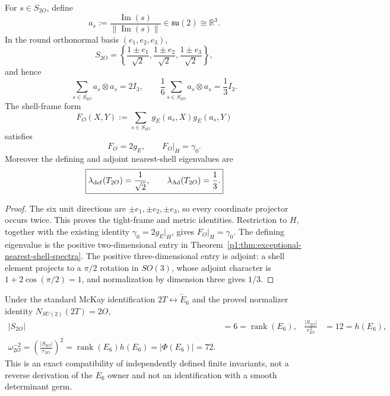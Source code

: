 \documentclass[11pt]{article}
\begin{document}
\begin{theorem}
\label{p1:thm:2O-nearest-shell-tangent-frame}
For \(s\in S_{2O}\), define
\[
 a_s:=\frac{\operatorname{Im}(s)}{\|\operatorname{Im}(s)\|}
 \in\mathfrak{su}(2)\cong\mathbb R^3.
\]
In the round orthonormal basis \((e_1,e_2,e_3)\),
\[
 S_{2O}=\left\{
 \frac{1\pm e_1}{\sqrt2},
 \frac{1\pm e_2}{\sqrt2},
 \frac{1\pm e_3}{\sqrt2}\right\},
\]
and hence
\begin{equation}
\label{p1:eq:2O-shell-tight-frame}
 \boxed{\sum_{s\in S_{2O}}a_s\otimes a_s=2I_3,\qquad
 \frac1{6}\sum_{s\in S_{2O}}a_s\otimes a_s=\frac13I_3.}
\end{equation}
The shell-frame form
\[
 F_O(X,Y):=\sum_{s\in S_{2O}}
 g_E(a_s,X)g_E(a_s,Y)
\]
satisfies
\begin{equation}
\label{p1:eq:2O-shell-frame-metric}
 \boxed{F_O=2g_E,\qquad F_O|_H=\gamma_0.}
\end{equation}
Moreover the defining and adjoint nearest-shell eigenvalues are
\begin{equation}
\label{p1:eq:2O-def-ad-eigenvalues}
 \boxed{\lambda_{\rm def}(T_{2O})=\frac1{\sqrt2},\qquad
 \lambda_{\operatorname{Ad}}(T_{2O})=\frac13.}
\end{equation}
\end{theorem}

\begin{proof}
The six unit directions are \(\pm e_1,\pm e_2,\pm e_3\), so every coordinate
projector occurs twice.  This proves the tight-frame and metric identities.
Restriction to \(H\), together with the existing identity
\(\gamma_0=2g_E|_H\), gives \(F_O|_H=\gamma_0\).  The defining eigenvalue is
the positive two-dimensional entry in
Theorem~\ref{p1:thm:exceptional-nearest-shell-spectra}.  The positive
three-dimensional entry is adjoint: a shell element projects to a
\(\pi/2\) rotation in \(SO(3)\), whose adjoint character is
\(1+2\cos(\pi/2)=1\), and normalization by dimension three gives \(1/3\).
\end{proof}

\begin{corollary}
\label{p1:cor:2O-shell-E6-reconstruction}
Under the standard McKay identification
\(2T\leftrightarrow\widetilde E_6\) and the proved normalizer identity
\(N_{SU(2)}(2T)=2O\),
\begin{align}
\label{p1:eq:2O-shell-E6-rank-coxeter}
 |S_{2O}|&=6=\operatorname{rank}(E_6),&
 \frac{|S_{2O}|}{r_{2O}^{\,2}}&=12=h(E_6),\\
\label{p1:eq:2O-shell-E6-root-count}
 \boxed{\omega_{2O}^{-2}
 =\left(\frac{|S_{2O}|}{r_{2O}}\right)^2
 =\operatorname{rank}(E_6)h(E_6)
 =|\Phi(E_6)|=72.}
\end{align}
This is an exact compatibility of independently defined finite invariants,
not a reverse derivation of the \(E_6\) owner and not an identification with
a smooth determinant germ.
\end{corollary}
\end{document}
